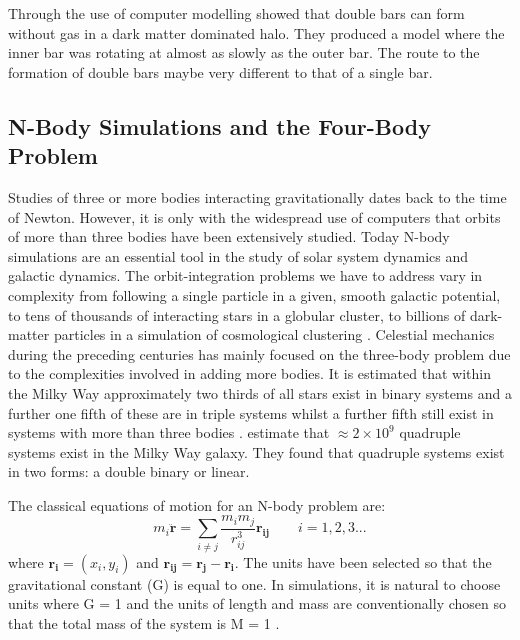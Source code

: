 \documentclass[a4paper,12pt]{article}
\begin{document}
Through the use of computer modelling \cite{saha} showed that double bars can form without gas in a dark matter dominated halo. They produced a model where the inner bar was rotating at almost as slowly as the 
outer bar. The route to the formation of double bars maybe very different to that of a single bar.

\subsection{N-Body Simulations and the Four-Body Problem}
Studies of three or more bodies interacting gravitationally dates back to the time of Newton. However, it is only with the widespread use of computers that orbits of more than three bodies have been extensively studied. Today
N-body simulations are an essential tool in the study of solar system dynamics and galactic dynamics. The orbit-integration problems we have to address
vary in complexity from following a single particle in a given, smooth galactic potential, to tens of thousands of interacting stars in a globular cluster, to billions of dark-matter particles in a 
simulation of cosmological clustering \citep{binney}. Celestial mechanics during the preceding centuries has mainly focused on the three-body problem
due to the complexities involved in adding more bodies. It is estimated that within the Milky Way approximately two thirds of all stars exist in binary systems and a further one fifth of these are in triple systems whilst a
further fifth still exist in systems with more than three bodies \citep{steves}. \cite{steves} estimate that $\approx2\times10^9$ quadruple systems exist in the Milky Way galaxy. They found that quadruple systems exist in two
forms: a double binary or linear.

The classical equations of motion for an N-body problem are:
\begin{equation}
m_i\mathbf{\ddot{r}}=\sum_{i\neq{j}}\frac{{m_i}{m_j}}{r^3_{ij}}\mathbf{r_{ij}}
\qquad
i=1,2,3...
\end{equation}
where $\mathbf{r_i}=\left(x_i,y_i\right)$ and $\mathbf{r_{ij}}=\mathbf{r_j}-\mathbf{r_i}$. 
The units have been selected so that the gravitational constant (G) is equal to one. In simulations, it is natural to choose units where G = 1 and the units of length and mass are conventionally chosen
so that the total mass of the system is M = 1 \citep{heggie}.
\end{document}
